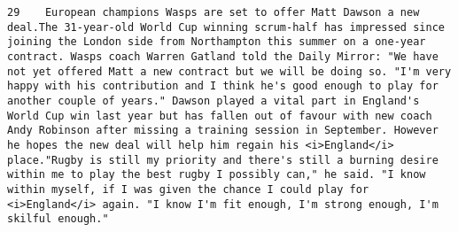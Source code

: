 \documentclass[11pt]{article}
\begin{document}
\begin{Verbatim}[commandchars=\\\{\}]
         29    European champions Wasps are set to offer Matt Dawson a new deal.The 31-year-old World Cup winning scrum-half has impressed since joining the London side from Northampton this summer on a one-year contract. Wasps coach Warren Gatland told the Daily Mirror: "We have not yet offered Matt a new contract but we will be doing so. "I'm very happy with his contribution and I think he's good enough to play for another couple of years." Dawson played a vital part in England's World Cup win last year but has fallen out of favour with new coach Andy Robinson after missing a training session in September. However he hopes the new deal will help him regain his <i>England</i> place."Rugby is still my priority and there's still a burning desire within me to play the best rugby I possibly can," he said. "I know within myself, if I was given the chance I could play for <i>England</i> again. "I know I'm fit enough, I'm strong enough, I'm skilful enough."                                                                                                                                                                                                                                                                                                                                                                                                                                                                                                                                                                                                                                                                                                                                                                                                                                                                                                                                                                                                                                                                                                                                                                                                                                                                                                                                                                                                                                                                                                                                                                                                                                                                                                                                                                                                                                                                                                                                                                                                                                                                                                                                                                                                                                                                                                                                                                                                                             
\end{Verbatim}
\end{document}
